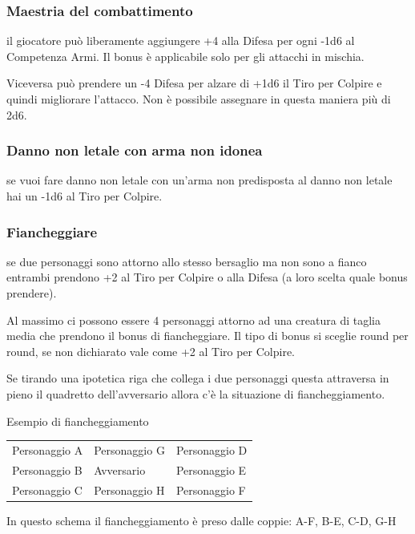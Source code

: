 \documentclass[a4paper,11pt,twoside,openany]{book}
\begin{document}
\subsubsection{Maestria del combattimento} il giocatore può liberamente aggiungere +4 alla Difesa per ogni -1d6 al Competenza Armi. Il bonus è applicabile solo per gli attacchi in mischia.

Viceversa può prendere un -4 Difesa per alzare di +1d6 il Tiro per Colpire e quindi migliorare l'attacco. Non è possibile assegnare in questa maniera più di 2d6.

\subsubsection{Danno non letale con arma non idonea} se vuoi fare danno non letale con un'arma non predisposta al danno non letale hai un -1d6 al Tiro per Colpire.

\subsubsection{Fiancheggiare} se due personaggi sono attorno allo stesso bersaglio ma non sono a fianco entrambi prendono +2 al Tiro per Colpire o alla Difesa (a loro scelta quale bonus prendere).

Al massimo ci possono essere 4 personaggi attorno ad una creatura di taglia media che prendono il bonus di fiancheggiare. Il tipo di bonus si sceglie round per round, se non dichiarato vale come +2 al Tiro per Colpire.

Se tirando una ipotetica riga che collega i due personaggi questa attraversa in pieno il quadretto dell'avversario allora c'è la situazione di fiancheggiamento.

\bigskip

Esempio di fiancheggiamento

\medskip

\begin{tabularx}{0.95\textwidth}{XXX}
	\toprule
	Personaggio A & Personaggio G & Personaggio D\\
	Personaggio B & Avversario    & Personaggio E\\
	Personaggio C & Personaggio H & Personaggio F\\
\end{tabularx}

\bigskip

In questo schema il fiancheggiamento è preso dalle coppie: A-F, B-E, C-D, G-H
\end{document}

